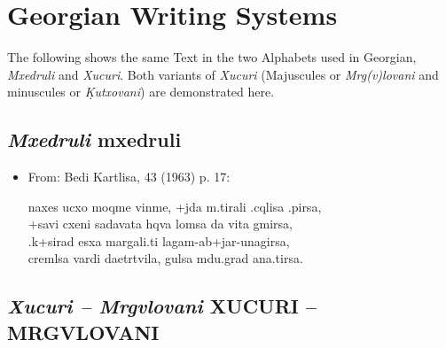 \documentclass[12pt]{article}
\begin{document}
\section*{Georgian Writing Systems}
The following shows the same Text in the two Alphabets
used in Georgian, {\it Mxedruli\/} and {\it Xucuri\/}.
Both variants of {\it Xucuri\/} (Majuscules or {\it Mrg(v)lovani\/}
and minuscules or {\it \d Kutxovani\/}) are demonstrated here.

\subsection*{\emph{Mxedruli} \mxedb mxedruli}


\begin{itemize}
\item From: Bedi Kartlisa, 43 (1963) p. 17:

\begin{mxedr}
naxes ucxo moqme vinme, +jda m.tirali .cqlisa .pirsa,\\
+savi cxeni sadavata hqva lomsa da vita gmirsa,\\
.k+sirad esxa margali.ti lagam-ab+jar-unagirsa,\\
cremlsa vardi daetrtvila, gulsa mdu.grad ana.tirsa.
\end{mxedr}
\end{itemize}

\subsection*{\emph{Xucuri -- Mrgvlovani} \xucr XUCURI -- MRGVLOVANI}
\end{document}
